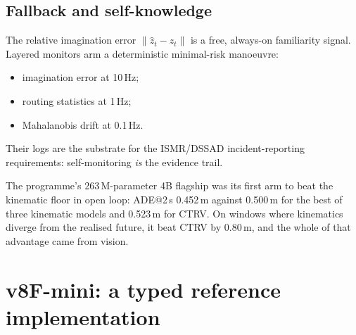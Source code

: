 \documentclass[10pt,twocolumn]{article}
\theoremstyle{remark}
\begin{document}
\subsection{Fallback and self-knowledge}
The relative imagination error $\|\hat z_t-z_t\|$ is a free, always-on familiarity signal. Layered monitors arm a deterministic
minimal-risk manoeuvre:
\begin{itemize}
  \item imagination error at 10\,Hz;
  \item routing statistics at 1\,Hz;
  \item Mahalanobis drift at 0.1\,Hz.
\end{itemize}
Their logs are the substrate for the ISMR/DSSAD incident-reporting requirements: self-monitoring \emph{is} the evidence trail.

The programme's 263\,M-parameter 4B flagship was its first arm to beat the kinematic floor in open loop: ADE@2\,s 0.452\,m against
0.500\,m for the best of three kinematic models and 0.523\,m for CTRV. On windows where kinematics diverge from the realised future, it
beat CTRV by 0.80\,m, and the whole of that advantage came from vision.

\section{v8F-mini: a typed reference implementation}\label{sec:v8f}
\end{document}
